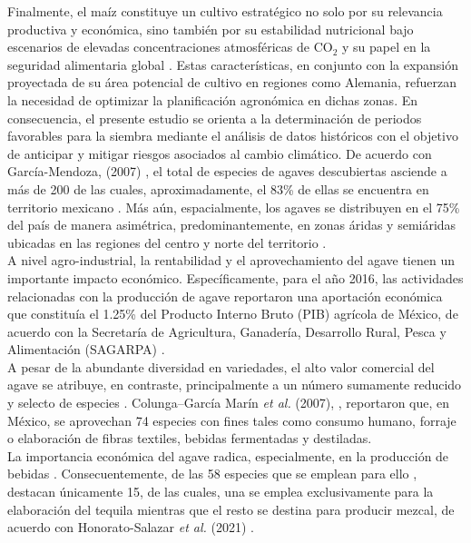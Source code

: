 Finalmente, el maíz constituye un cultivo estratégico no solo por su relevancia productiva y económica, sino también por su estabilidad nutricional bajo escenarios de elevadas concentraciones atmosféricas de CO$_2$ \cite{Myers_2014} y su papel en la seguridad alimentaria global \cite{TANUMIHARDJO_2020}. Estas características, en conjunto con la expansión proyectada de su área potencial de cultivo en regiones como Alemania, refuerzan la necesidad de optimizar la planificación agronómica en dichas zonas. En consecuencia, el presente estudio se orienta a la determinación de periodos favorables para la siembra mediante el análisis de datos históricos con el objetivo de anticipar y mitigar riesgos asociados al cambio climático.
\iffalse
  De acuerdo con García-Mendoza, (2007) \cite{Garcia-Mendoza_2007}, el total de especies de agaves descubiertas asciende a más de 200 de las cuales, aproximadamente, el 83\% de ellas se encuentra en territorio mexicano \cite{Alducin-Martínez_2023}.  Más aún, espacialmente, los agaves se distribuyen en el 75\% del país de manera asimétrica, predominantemente, en zonas áridas y semiáridas ubicadas en las regiones del centro y norte del territorio \cite{Garcia-Mendoza_2007}.\\

A nivel agro-industrial, la rentabilidad y el aprovechamiento del agave tienen un importante impacto económico. Específicamente, para el año 2016, las actividades relacionadas con la producción de agave reportaron una aportación económica que constituía el 1.25\% del Producto Interno Bruto (PIB) agrícola de México, de acuerdo con la Secretaría de Agricultura, Ganadería, Desarrollo Rural, Pesca y Alimentación (SAGARPA) \cite{SAGARPA_2017_Agave}.\\

A pesar de la abundante diversidad en variedades, el alto valor comercial del agave se atribuye, en contraste, principalmente a un número sumamente reducido y selecto de especies \cite{Honorato-Salazar_2021}. Colunga--García Marín \textit{et al.} (2007),  \cite{Colunga-Garcia_2007}, reportaron que, en México, se aprovechan 74 especies con fines tales como consumo humano, forraje o elaboración de fibras textiles, bebidas fermentadas y destiladas.\\


La importancia económica del agave radica, especialmente, en la producción de bebidas \cite{Perez-Zavala_2020}. Consecuentemente, de las 58 especies que se emplean para ello \cite{Colunga-Garcia_2007}, destacan únicamente 15, de las cuales, una se emplea exclusivamente para la elaboración del tequila mientras que el resto se destina para producir mezcal, de acuerdo con Honorato-Salazar \textit{et al.} (2021) \cite{Honorato-Salazar_2021}.\\

